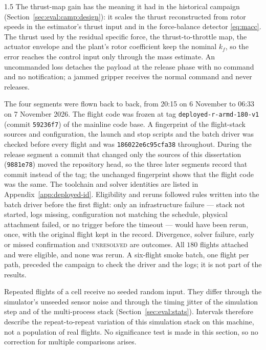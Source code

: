 \begin{spacing}{1.5}
The thrust-map gain has the meaning it had in the historical campaign
(Section~\ref{sec:eval:camp:design}): it scales the thrust reconstructed from
rotor speeds in the estimator's thrust input and in the force-balance detector
\eqref{eq:macc}. The thrust used by the residual specific force, the
thrust-to-throttle map, the actuator envelope and the plant's rotor
coefficient keep the nominal $k_f$, so the error reaches the control input only
through the mass estimate. An uncommanded loss detaches the payload at the
release phase with no command and no notification; a jammed gripper receives
the normal command and never releases.

The four segments were flown back to back, from 20:15 on 6 November to 06:33 on
7 November 2026. The flight code was frozen at tag
\texttt{deployed-r-armd-180-v1} (commit \texttt{59236f7}) of the mainline code
base. A fingerprint of the flight-stack sources and configuration, the launch and
stop scripts and the batch driver was checked before every flight and was
\texttt{186022e6c95cfa38} throughout. During the release segment a commit that
changed only the sources of this dissertation (\texttt{9881e78}) moved the
repository head, so the three later segments record that commit instead of the
tag; the unchanged fingerprint shows that the flight code was the same. The
toolchain and solver identities are listed in Appendix~\ref{app:deployed-id}.
Eligibility and reruns followed rules written into the batch driver before the
first flight: only an infrastructure failure --- stack not started, logs
missing, configuration not matching the schedule, physical attachment failed, or
no trigger before the timeout --- would have been rerun, once, with the original
flight kept in the record. Divergence, solver failure, early or missed
confirmation and \textsc{unresolved} are outcomes. All $180$ flights attached
and were eligible, and none was rerun. A six-flight smoke batch, one flight per
path, preceded the campaign to check the driver and the logs; it is not part of
the results.

Repeated flights of a cell receive no seeded random input. They differ through
the simulator's unseeded sensor noise and through the timing jitter of the
simulation step and of the multi-process stack
(Section~\ref{sec:eval:stats}). Intervals therefore describe the
repeat-to-repeat variation of this simulation stack on this machine, not a
population of real flights. No significance test is made in this section, so
no correction for multiple comparisons arises.


\end{spacing}
